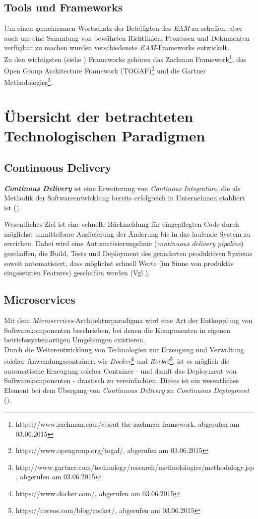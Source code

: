 \documentclass{llncs}
\begin{document}
\subsection{Tools und Frameworks}
Um einen gemeinsamen Wortschatz der Beteiligten des \textit{EAM} zu schaffen, aber auch um eine Sammlung von bewährten Richtlinien, Prozessen und Dokumenten verfügbar zu machen wurden verschiedenste \textit{EAM}-Frameworks entwickelt.\\

Zu den wichtigsten (siehe \cite{ben}) Frameworks gehören das Zachman Framework\footnote{https://www.zachman.com/about-the-zachman-framework, abgerufen am 03.06.2015}, das Open Group Architecture Framework (TOGAF)\footnote{https://www.opengroup.org/togaf/, abgerufen am 03.06.2015} und die Gartner Methodologies\footnote{http://www.gartner.com/technology/research/methodologies/methodology.jsp, abgerufen am 03.06.2015}.
%
\section{Übersicht der betrachteten Technologischen Paradigmen}
%
\subsection{Continuous Delivery}
\textbf{\textit{Continous Delivery}} ist eine Erweiterung von \textit{Continous Integration}, die als Methodik der Softwareentwicklung bereits erfolgreich in Unternehmen etabliert ist (\cite{fit:sto}).

Wesentliches Ziel ist eine schnelle Rückmeldung für eingepflegten Code durch möglichst unmittelbare Auslieferung der Änderung bis in das laufende System zu erreichen. Dabei wird eine Automatisierungslinie (\textit{continuous delivery pipeline}) geschaffen, die Build, Tests und Deployment des geänderten produktiven Systems soweit automatisiert, dass möglichst schnell Werte (im Sinne von produktiv eingesetzten Features) geschaffen werden (Vgl \cite{wolff}).
%
\subsection{Microservices}
Mit dem \textit{Microservices}-Architekturparadigma wird eine Art der Entkopplung von Softwarekomponenten beschrieben, bei denen die Komponenten in eigenen betriebssystemartigen Umgebungen existieren.\\

Durch die Weiterentwicklung von Technologien zur Erzeugung und Verwaltung solcher Anwendungscontainer, wie \textit{Docker}\footnote{https://www.docker.com/, abgerufen am 03.06.2015} und \textit{Rocket}\footnote{https://coreos.com/blog/rocket/, abgerufen am 03.06.2015}, ist es möglich die automatische Erzeugung solcher Container - und damit das Deployment von Softwarekomponenten - drastisch zu vereinfachten. Dieses ist ein wesentliches Element bei dem Übergang von \textit{Continuous Delivery} zu \textit{Continuous Deployment} (\cite{wolff}).\\
\end{document}
